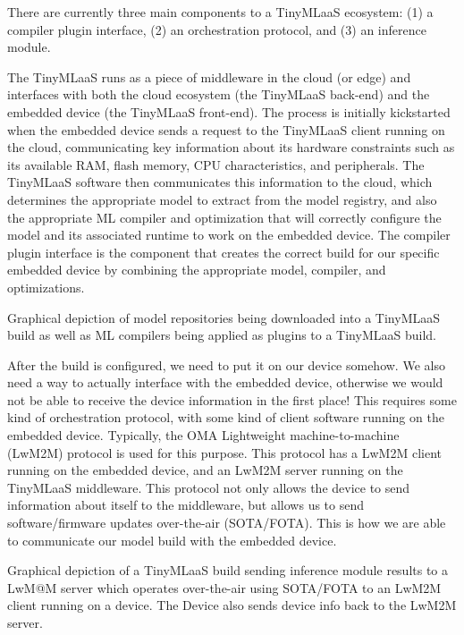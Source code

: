 {{{{{{    There are currently three main components to a TinyMLaaS ecosystem: (1) a compiler plugin interface, (2) an orchestration protocol, and (3) an inference module. 
    
    The TinyMLaaS runs as a piece of middleware in the cloud (or edge) and interfaces with both the cloud ecosystem (the TinyMLaaS back-end) and the embedded device (the TinyMLaaS front-end). The process is initially kickstarted when the embedded device sends a request to the TinyMLaaS client running on the cloud, communicating key information about its hardware constraints such as its available RAM, flash memory, CPU characteristics, and peripherals. The TinyMLaaS software then communicates this information to the cloud, which determines the appropriate model to extract from the model registry, and also the appropriate ML compiler and optimization that will correctly configure the model and its associated runtime to work on the embedded device. The compiler plugin interface is the component that creates the correct build for our specific embedded device by combining the appropriate model, compiler, and optimizations.
    
    
    Graphical depiction of model repositories being downloaded into a TinyMLaaS build as well as ML compilers being applied as plugins to a TinyMLaaS build.
    
    After the build is configured, we need to put it on our device somehow. We also need a way to actually interface with the embedded device, otherwise we would not be able to receive the device information in the first place! This requires some kind of orchestration protocol, with some kind of client software running on the embedded device. Typically, the OMA Lightweight machine-to-machine (LwM2M) protocol is used for this purpose. This protocol has a LwM2M client running on the embedded device, and an LwM2M server running on the TinyMLaaS middleware. This protocol not only allows the device to send information about itself to the middleware, but allows us to send software/firmware updates over-the-air (SOTA/FOTA). This is how we are able to communicate our model build with the embedded device.

    
    Graphical depiction of a TinyMLaaS build sending inference module results to a LwM@M server which operates over-the-air using SOTA/FOTA to an LwM2M client running on a device. The Device also sends device info back to the LwM2M server.
    
}}}}}}
